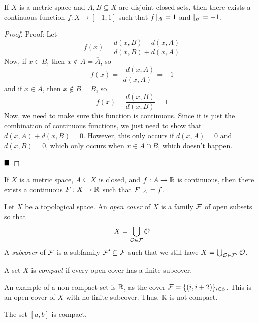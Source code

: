 \begin{lemma}
    If $X$ is a metric space and $A, B \subseteq X$ are disjoint closed sets, then there exists a continuous function $f : X \to [-1, 1]$ such that $f \res{A} = 1$ and $ \res{B} = -1$. 
\end{lemma}
\begin{proof}{Proof:}
    Let 
    \[ f(x) = \frac{d(x, B) - d(x, A)}{d(x, B) + d(x, A)} \]
    Now, if $x \in B$, then $x \notin A = \overline{A}$, so
    \[ f(x) = \frac{-d(x, A)}{d(x, A)} = -1 \]
    and if $x \in A$, then $x \notin B = \overline{B}$, so
    \[ f(x) = \frac{d(x, B)}{d(x, B)} = 1 \]
    Now, we need to make sure this function is continuous. Since it is just the combination of continuous functions, we just need to show that $d(x, A) + d(x, B) = 0$. However, this only occurs if $d(x, A) = 0$ and $d(x, B) = 0$, which only occurs when $x \in A \cap B$, which doesn't happen.

    $\qed$
\end{proof}

\begin{theorem}
    If $X$ is a metric space, $A \subseteq X$ is closed, and $f : A \to \R$ is continuous, then there exists a continuous $F : X \to \R$ such that $F \res{A} = f$. 
\end{theorem}

\begin{definition}
    Let $X$ be a topological space. An \emph{open cover} of $X$ is a family $\cal{F}$ of open subsets so that
    \[ X = \bigcup_{\cal{O} \in \cal{F}} \cal{O} \]
    A \emph{subcover} of $\cal{F}$ is a subfamily $\cal{F}' \subseteq \cal{F}$ such that we still have $X = \bigcup_{\cal{O} \in \cal{F}'} \cal{O}$. 
\end{definition}

\begin{definition}
    A set $X$ is \emph{compact} if every open cover has a finite subcover.
\end{definition}
An example of a non-compact set is $\R$, as the cover $\cal{F} = \{(i, i + 2)\}_{i \in \Z}$. This is an open cover of $X$ with no finite subcover. Thus, $\R$ is not compact.\\

\begin{theorem}
    The set $[a, b]$ is compact.
\end{theorem}

